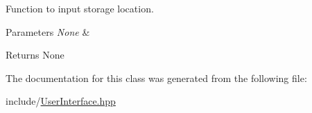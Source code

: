 Function to input storage location. 


\begin{DoxyParams}{Parameters}
{\em None} & \\
\hline
\end{DoxyParams}
\begin{DoxyReturn}{Returns}
None 
\end{DoxyReturn}


The documentation for this class was generated from the following file\+:\begin{DoxyCompactItemize}
\item 
include/\hyperlink{UserInterface_8hpp}{User\+Interface.\+hpp}\end{DoxyCompactItemize}
